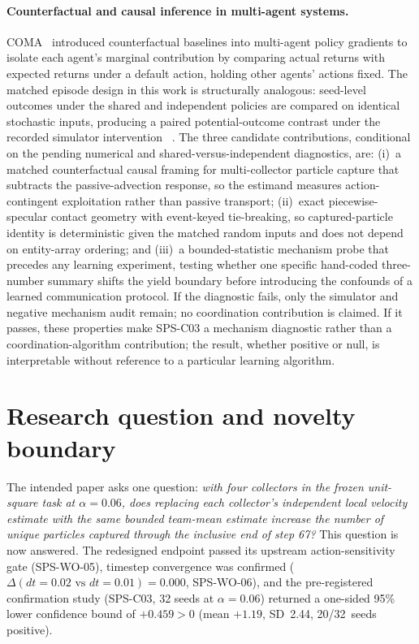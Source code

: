 \documentclass{article}
\begin{document}
\paragraph{Counterfactual and causal inference in multi-agent systems.}
COMA~\cite{foerster2018coma} introduced counterfactual baselines into
multi-agent policy gradients to isolate each agent's marginal contribution by
comparing actual returns with expected returns under a default action, holding
other agents' actions fixed. The matched episode design in this work is
structurally analogous: seed-level outcomes under the shared and independent
policies are compared on identical stochastic inputs, producing a paired
potential-outcome contrast under the recorded simulator intervention
~\cite{morgan2015counterfactuals,imbens2015causal}.
The three candidate contributions, conditional on the pending numerical and
shared-versus-independent diagnostics, are:
(i)~a matched counterfactual causal framing for multi-collector particle
capture that subtracts the passive-advection response, so the estimand
measures action-contingent exploitation rather than passive transport;
(ii)~exact piecewise-specular contact geometry with event-keyed tie-breaking,
so captured-particle identity is deterministic given the matched random inputs
and does not depend on entity-array ordering; and
(iii)~a bounded-statistic mechanism probe that precedes any learning
experiment, testing whether one specific hand-coded three-number summary shifts the
yield boundary before introducing the confounds of a learned communication
protocol.
If the diagnostic fails, only the simulator and negative mechanism audit remain;
no coordination contribution is claimed. If it passes, these properties make
SPS-C03 a mechanism diagnostic rather than a
coordination-algorithm contribution; the result, whether positive or null, is
interpretable without reference to a particular learning algorithm.

\section{Research question and novelty boundary}

The intended paper asks one question: \emph{with four collectors in the frozen
unit-square task at \(\alpha=0.06\), does replacing each collector's independent
local velocity estimate with the same bounded team-mean estimate increase the
number of unique particles captured through the inclusive end of step 67?}
This question is now answered. The redesigned endpoint passed its upstream
action-sensitivity gate (SPS-WO-05), timestep convergence was confirmed
($\Delta(dt{=}0.02\text{ vs }dt{=}0.01)=0.000$, SPS-WO-06), and the
pre-registered confirmation study (SPS-C03, 32 seeds at $\alpha=0.06$) returned
a one-sided 95\% lower confidence bound of $+0.459>0$ (mean $+1.19$, SD~2.44,
20/32~seeds positive).
\end{document}
